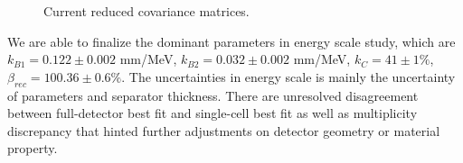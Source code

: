 \begin{figure}[h!]
\centering
{} \quad
{} \quad
\caption{Current reduced covariance matrices.}
\label{fig:cov}
\end{figure}


We are able to finalize the dominant parameters in energy scale study, which are $k_{B1} = 0.122 \pm 0.002$ mm/MeV, $k_{B2} = 0.032 \pm 0.002$ mm/MeV, $k_C = 41 \pm 1\%$, $\beta_{rec} = 100.36\pm0.6\%$.
The uncertainties in energy scale is mainly the uncertainty of parameters and separator thickness.
There are unresolved disagreement between full-detector best fit and single-cell best fit as well as multiplicity discrepancy that hinted further adjustments on detector geometry or material property.











